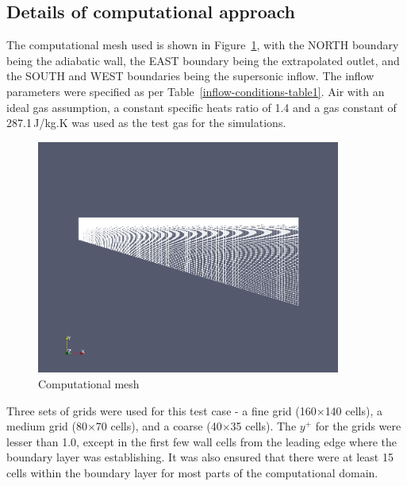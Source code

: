 \subsection{Details of computational approach}
\label{flat-plate-computational-approach}
%
The computational mesh used is shown in Figure~\ref{computational-mesh},
with the NORTH boundary being the adiabatic wall, the EAST boundary being
the extrapolated outlet, and the SOUTH and WEST boundaries being the
supersonic inflow. The inflow parameters were specified as per
Table~\ref{inflow-conditions-table1}. Air with an ideal gas assumption, a
constant specific heats ratio of 1.4 and a gas constant of 287.1\,J/kg.K was used
as the test gas for the simulations.
\begin{figure}[h]
 \begin{center}
  \includegraphics[width=10cm]{./chap2-flat-plate/figs/grid.png}
 \end{center}
 \caption{Computational mesh}
 \label{computational-mesh}
\end{figure}
Three sets of grids were used for this test case - a fine grid
(160$\times$140 cells), a medium grid (80$\times$70 cells), and a coarse (40$\times$35 cells).
The $y^+$ for the grids were lesser than 1.0, except in the first few wall
cells from the leading edge where the boundary layer was establishing.
It was also ensured that there were at least 15 cells within the
boundary layer for most parts of the computational domain.
